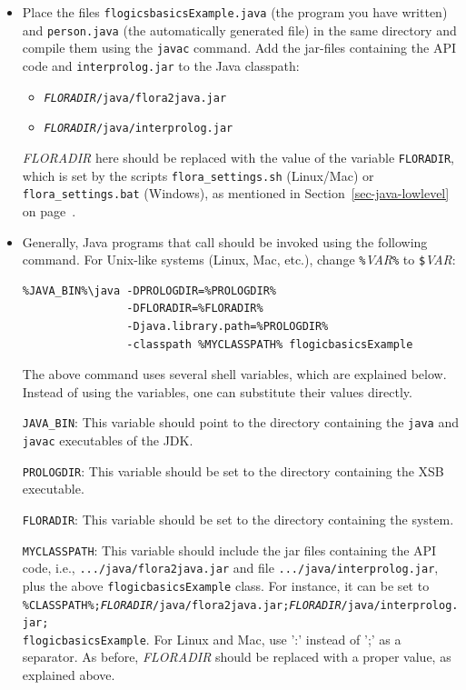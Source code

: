 \begin{itemize}
\item Place the files {\tt flogicsbasicsExample.java} (the program you have
  written) and {\tt person.java} (the automatically generated file)
in the same directory and compile them using the {\tt javac}  command. Add
the jar-files containing the API code and
{\tt interprolog.jar}  to the Java classpath:
\begin{itemize}
\item  \texttt{\textnormal{\textit{FLORADIR}}/java/flora2java.jar}
\item  \texttt{\textnormal{\textit{FLORADIR}}/java/interprolog.jar}
\end{itemize}
\textit{FLORADIR} here should be replaced with the value of the
variable \texttt{FLORADIR}, which is set by the 
scripts \texttt{flora\_settings.sh} (Linux/Mac) or \texttt{flora\_settings.bat}
(Windows), as mentioned in Section~\ref{sec-java-lowlevel} on
page~\pageref{page-floradir}.


\item Generally, Java programs that call \FLSYSTEM
  should be invoked using the following command. For Unix-like systems
  (Linux, Mac, etc.), change \texttt{\%}\textit{VAR}\texttt{\%} to
      \texttt{\$}\textit{VAR}:
\begin{verbatim}
%JAVA_BIN%\java -DPROLOGDIR=%PROLOGDIR%
                -DFLORADIR=%FLORADIR%
                -Djava.library.path=%PROLOGDIR%
                -classpath %MYCLASSPATH% flogicbasicsExample
\end{verbatim}
The above command uses several shell variables, which are explained below.
Instead of using the variables, one can substitute their values directly.

{\tt JAVA\_BIN}: This variable should point to the directory
containing the {\tt java}  and {\tt javac}  executables of the JDK.

{\tt PROLOGDIR}: This variable should be set to the
directory containing the XSB executable.

{\tt FLORADIR}: This variable should be set to the directory
containing the \FLSYSTEM system.

{\tt MYCLASSPATH}: This variable should include the jar files
containing the API code, i.e., \texttt{.../java/flora2java.jar} 
and file {\tt .../java/interprolog.jar}, plus the above
\texttt{flogicbasicsExample} class. For instance, it can be set to
\texttt{\%CLASSPATH\%;\textnormal{\textit{FLORADIR}}/java/flora2java.jar;\textnormal{\textit{FLORADIR}}/java/interprolog.jar;\\flogicbasicsExample}.
For Linux and Mac, use ':' instead of ';' as a separator.
As before, \emph{FLORADIR} should be replaced with a proper value, as
explained above. 


\end{itemize}
